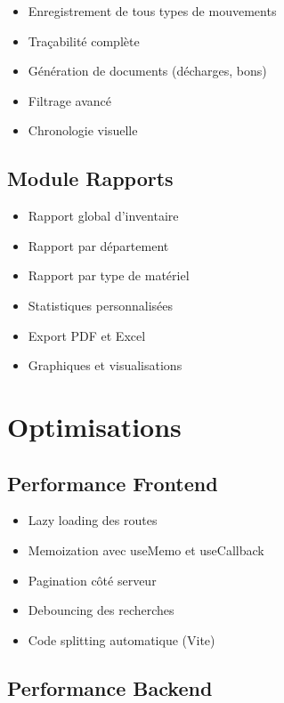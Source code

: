 \begin{itemize}
    \item Enregistrement de tous types de mouvements
    \item Traçabilité complète
    \item Génération de documents (décharges, bons)
    \item Filtrage avancé
    \item Chronologie visuelle
\end{itemize}

\subsection{Module Rapports}

\begin{itemize}
    \item Rapport global d'inventaire
    \item Rapport par département
    \item Rapport par type de matériel
    \item Statistiques personnalisées
    \item Export PDF et Excel
    \item Graphiques et visualisations
\end{itemize}

\section{Optimisations}

\subsection{Performance Frontend}

\begin{itemize}
    \item Lazy loading des routes
    \item Memoization avec useMemo et useCallback
    \item Pagination côté serveur
    \item Debouncing des recherches
    \item Code splitting automatique (Vite)
\end{itemize}

\subsection{Performance Backend}

